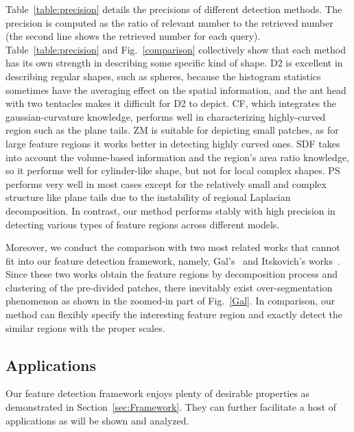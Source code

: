 Table~\ref{table:precision} details the precisions of different
detection methods. The precision is computed as the ratio of relevant
number to the retrieved number (the second line shows the retrieved
number for each query).  Table~\ref{table:precision} and
Fig.~\ref{comparison} collectively show that each method has its own
strength in describing some specific kind of shape. D2 is excellent
in describing regular shapes, such as spheres, because the histogram
statistics sometimes have the averaging effect on the spatial
information, and the ant head with two tentacles makes it difficult
for D2 to depict. CF, which integrates the gaussian-curvature
knowledge, performs well in characterizing highly-curved region such as
the plane tails. ZM is suitable for depicting small patches, as for
large feature regions it works better in detecting highly curved ones.
SDF takes into account the volume-based information and the region's
area ratio knowledge, so it performs well for cylinder-like shape, but
not for local complex shapes. PS performs very well in most cases except
for the relatively small and complex structure like plane tails due to
the instability of regional Laplacian decomposition. In contrast, our
method performs stably with high precision in detecting various types
of feature regions across different models.

Moreover, we conduct the comparison with two most related works that
cannot fit into our feature detection framework, namely,
Gal's~\cite{Gal2006} and Itskovich's works~\cite{Itskovich2011}.
Since these two works obtain the feature regions by decomposition
process and clustering of the pre-divided patches, there inevitably
exist over-segmentation phenomenon as shown in the zoomed-in part of
Fig.~\ref{Gal}. In comparison, our method can flexibly specify the
interesting feature region and exactly detect the similar regions with
the proper scales.

\subsection{Applications}

Our feature detection framework enjoys plenty of desirable properties
as demonstrated in Section~\ref{sec:Framework}. They can further
facilitate a host of applications as will be shown and analyzed.

